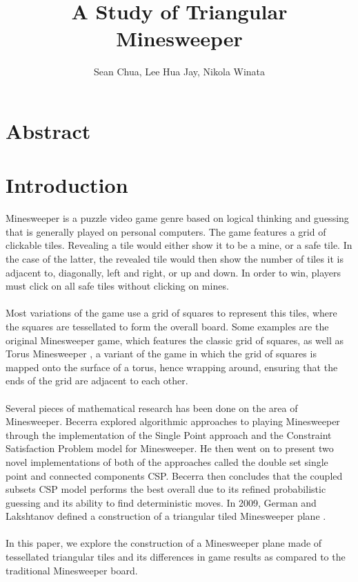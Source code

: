 \documentclass{article}
\title{A Study of Triangular Minesweeper}
\author{Sean Chua, Lee Hua Jay, Nikola Winata}
\begin{document}
\maketitle

\section{Abstract}

\newpage
\section{Introduction}
Minesweeper is a puzzle video game genre based on logical thinking and guessing that is generally played on personal computers. 
The game features a grid of clickable tiles. Revealing a tile would either show it to 
be a mine, or a safe tile. \parencite{minesweeper} In the case of the latter, the revealed tile would then show the number of tiles it is adjacent to,
diagonally, left and right, or up and down.
In order to win, players must click on all safe tiles without clicking on mines. \\\\
Most variations of the game use a grid of squares to represent this tiles, where the squares are tessellated to form
the overall board. Some examples are the original Minesweeper game, which features the classic grid of squares,
as well as Torus Minesweeper \parencite{torusminesweeper}, a variant of the game in which the grid of squares is mapped onto the surface of a torus,
hence wrapping around, ensuring that the ends of the grid are adjacent to each other. \\\\
Several pieces of mathematical research has been done on the area of Minesweeper. Becerra \parencite{becerra} explored algorithmic approaches
to playing Minesweeper through the implementation of the Single Point approach and the Constraint Satisfaction Problem model for Minesweeper.
He then went on to present two novel implementations of both of the approaches called the double set single point and connected components CSP. 
Becerra then concludes that the coupled subsets CSP model performs the best overall due to its refined probabilistic guessing and 
its ability to find deterministic moves. In 2009, German and Lakshtanov defined a construction of a triangular tiled Minesweeper plane \parencite{laplacian}.
\\\\In this paper, we explore the construction of a Minesweeper plane made of tessellated triangular tiles and its differences in game results as compared to the traditional
Minesweeper board.


\printbibliography
\end{document}
